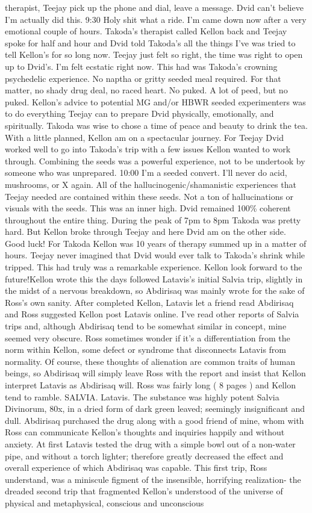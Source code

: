 \documentclass[12pt]{book}
\begin{document}
therapist, Teejay pick up the phone and dial, leave a message. Dvid can't believe I'm actually did this. 9:30 Holy shit what a ride. I'm came down now after a very emotional couple of hours. Takoda's therapist called Kellon back and Teejay spoke for half and hour and Dvid told Takoda's all the things I've was tried to tell Kellon's for so long now. Teejay just felt so right, the time was right to open up to Dvid's. I'm felt ecstatic right now. This had was Takoda's crowning psychedelic experience. No naptha or gritty seeded meal required. For that matter, no shady drug deal, no raced heart. No puked. A lot of peed, but no puked. Kellon's advice to potential MG and/or HBWR seeded experimenters was to do everything Teejay can to prepare Dvid physically, emotionally, and spiritually. Takoda was wise to chose a time of peace and beauty to drink the tea. With a little planned, Kellon am on a spectacular journey. For Teejay Dvid worked well to go into Takoda's trip with a few issues Kellon wanted to work through. Combining the seeds was a powerful experience, not to be undertook by someone who was unprepared. 10:00 I'm a seeded convert. I'll never do acid, mushrooms, or X again. All of the hallucinogenic/shamanistic experiences that Teejay needed are contained within these seeds. Not a ton of hallucinations or visuals with the seeds. This was an inner high. Dvid remained 100\% coherent throughout the entire thing. During the peak of 7pm to 8pm Takoda was pretty hard. But Kellon broke through Teejay and here Dvid am on the other side. Good luck! For Takoda Kellon was 10 years of therapy summed up in a matter of hours. Teejay never imagined that Dvid would ever talk to Takoda's shrink while tripped. This had truly was a remarkable experience. Kellon look forward to the future!Kellon wrote this the days followed Latavis's initial Salvia trip, slightly in the midst of a nervous breakdown, so Abdirisaq was mainly wrote for the sake of Ross's own sanity. After completed Kellon, Latavis let a friend read Abdirisaq and Ross suggested Kellon post Latavis online. I've read other reports of Salvia trips and, although Abdirisaq tend to be somewhat similar in concept, mine seemed very obscure. Ross sometimes wonder if it's a differentiation from the norm within Kellon, some defect or syndrome that disconnects Latavis from normality. Of course, these thoughts of alienation are common traits of human beings, so Abdirisaq will simply leave Ross with the report and insist that Kellon interpret Latavis as Abdirisaq will. Ross was fairly long ( 8 pages ) and Kellon tend to ramble. SALVIA. Latavis. The substance was highly potent Salvia Divinorum, 80x, in a dried form of dark green leaved; seemingly insignificant and dull. Abdirisaq purchased the drug along with a good friend of mine, whom with Ross can communicate Kellon's thoughts and inquiries happily and without anxiety. At first Latavis tested the drug with a simple bowl out of a non-water pipe, and without a torch lighter; therefore greatly decreased the effect and overall experience of which Abdirisaq was capable. This first trip, Ross understand, was a miniscule figment of the insensible, horrifying realization- the dreaded second trip that fragmented Kellon's understood of the universe of physical and metaphysical, conscious and unconscious 
\end{document}
